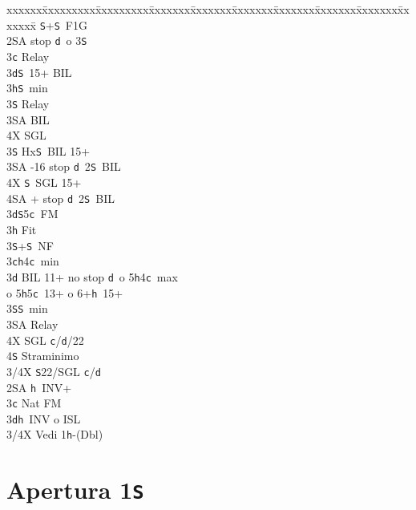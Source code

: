 \documentclass[a4paper,italian]{article}
\newcommand{\BS}{\small{\texttt{S}}}
\newcommand{\BC}{\small{\texttt{c}}}
\newcommand{\BD}{\small{\texttt{d}}}
\newcommand{\BH}{\small{\texttt{h}}}
\newcommand{\pdfs}{\texorpdfstring{\texttt{S}}{S}}
\newenvironment{bidtable}
{\begin{tabbing}

    xxxxxx\=xxxxxxxxx\=xxxxxxxxx\=xxxxxxx\=xxxxxxx\=xxxxxxx\=xxxxxxx\=xxxxxxx\=xxxxxxx\=xxxxxxx\=\kill}
{\end{tabbing} }%
\begin{document}
\begin{multicols}{2}
\begin{bidtable}
        \BS {}+\BS\ F1G\+\+\\
        2\small{SA}  stop \BD\ o 3\BS \+\\
        3\BC \> Relay\+\\
        3\BD {}\BS\ 15+ BIL\\
        3\BH {}\BS\ min\+\\
        3\BS \> Relay\+\\
        3\small{SA} \> BIL\\
        4X \> SGL\-\-\\
        3\BS \> Hx\BS\ BIL 15+\\
        3\small{SA} -16 stop \BD\ 2\BS\ BIL\\
        4X \BS\ SGL 15+\\
        4\small{SA} + stop \BD\ 2\BS\ BIL\-\\
        3\BD {}\BS 5\BC\ FM\\
        3\BH \> Fit\\
        3\BS {}+\BS\ NF\-\\
        3\BC {}\BH 4\BC\ min\\
        3\BD \> BIL 11+ no stop \BD\ o 5\BH 4\BC\ max\+\\ o 5\BH 5\BC\ 13+ o 6+\BH\ 15+\-\\
        3\BS {}\BS\ min\+\\
        3\small{SA} \> Relay\+\\
        4X \> SGL \BC /\BD /22\\
        4\BS \> Straminimo\-\-\\
        3/4X \BS 22/SGL \BC /\BD \-\\
        2\small{SA} \BH\ INV+\\
        3\BC\> Nat FM\\
        3\BD{}\BH\ INV o ISL\\
        3/4X \> Vedi 1\BH -(Dbl)\-
    \end{bidtable}

\end{multicols}

\newpage

\section{Apertura 1\pdfs}
\end{document}

